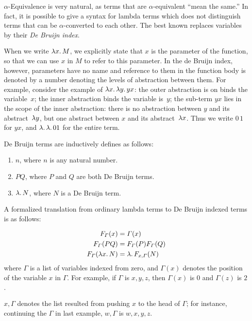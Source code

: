 \documentclass[../../../include/open-logic-section]{subfiles}
\begin{document}


$\alpha$-Equivalence is very natural, as terms that are
$\alpha$-equivalent ``mean the same.'' In fact, it is possible to give
a syntax for lambda terms which does not distinguish terms that can be
$\alpha$-converted to each other. The best known replaces variables by
their \emph{De Bruijn index}.

When we write $\lambd[x][M]$, we explicitly state that $x$ is the
parameter of the function, so that we can use $x$ in $M$ to refer to
this parameter. In the de Bruijn index, however, parameters have no
name and reference to them in the function body is denoted by a number
denoting the levels of abstraction between them. For example, consider
the example of $\lambd[x][\lambd[y][y x]]$: the outer abstraction is on
binds the variable~$x$; the inner abstraction binds the variable
is~$y$; the sub-term $y x$ lies in the scope of the inner abstraction:
there is no abstraction between $y$ and its abstract~$\lambd[y]$, but
one abstract between $x$ and its abstract~$\lambd[x]$. Thus we write
$0\, 1$ for $y x$, and $\lambd[][\lambd[][01]]$ for the entire term.

\begin{defn}
  De Bruijn terms are inductively defines as follows:
  \begin{enumerate}
  \item $n$, where $n$ is any natural number.
  \item $PQ$, where $P$ and $Q$ are both De Bruijn terms.
  \item $\lambd[][N]$, where $N$ is a De Bruijn term.
  \end{enumerate}
\end{defn}

A formalized translation from ordinary lambda terms to De Bruijn
indexed terms is as follows:
\begin{defn}
  \begin{align*}
    F_\Gamma(x) &= \Gamma(x) \\
    F_\Gamma(PQ) &= F_\Gamma(P)F_\Gamma(Q) \\
    F_\Gamma(\lambd[x][N]) &= \lambd[][F_{x,\Gamma}(N)]
  \end{align*}
  where $\Gamma$ is a list of variables indexed from zero, and
  $\Gamma(x)$ denotes the position of the variable $x$ in $\Gamma$.
  For example, if $\Gamma$ is $x,y,z$, then $\Gamma(x)$ is $0$ and
  $\Gamma(z)$ is $2$.
  
  $x,\Gamma$ denotes the list resulted from pushing $x$ to the head of
  $\Gamma$; for instance, continuing the $\Gamma$ in last example,
  $w,\Gamma$ is $w,x,y,z$.
\end{defn}
\end{document}

